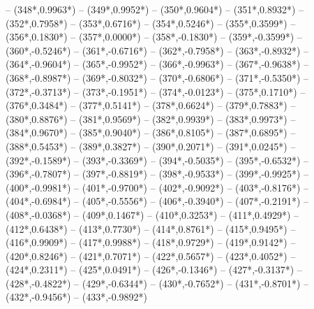 {		-- ({348*\dx},{0.9963*\dy})
		-- ({349*\dx},{0.9952*\dy})
		-- ({350*\dx},{0.9604*\dy})
		-- ({351*\dx},{0.8932*\dy})
		-- ({352*\dx},{0.7958*\dy})
		-- ({353*\dx},{0.6716*\dy})
		-- ({354*\dx},{0.5246*\dy})
		-- ({355*\dx},{0.3599*\dy})
		-- ({356*\dx},{0.1830*\dy})
		-- ({357*\dx},{0.0000*\dy})
		-- ({358*\dx},{-0.1830*\dy})
		-- ({359*\dx},{-0.3599*\dy})
		-- ({360*\dx},{-0.5246*\dy})
		-- ({361*\dx},{-0.6716*\dy})
		-- ({362*\dx},{-0.7958*\dy})
		-- ({363*\dx},{-0.8932*\dy})
		-- ({364*\dx},{-0.9604*\dy})
		-- ({365*\dx},{-0.9952*\dy})
		-- ({366*\dx},{-0.9963*\dy})
		-- ({367*\dx},{-0.9638*\dy})
		-- ({368*\dx},{-0.8987*\dy})
		-- ({369*\dx},{-0.8032*\dy})
		-- ({370*\dx},{-0.6806*\dy})
		-- ({371*\dx},{-0.5350*\dy})
		-- ({372*\dx},{-0.3713*\dy})
		-- ({373*\dx},{-0.1951*\dy})
		-- ({374*\dx},{-0.0123*\dy})
		-- ({375*\dx},{0.1710*\dy})
		-- ({376*\dx},{0.3484*\dy})
		-- ({377*\dx},{0.5141*\dy})
		-- ({378*\dx},{0.6624*\dy})
		-- ({379*\dx},{0.7883*\dy})
		-- ({380*\dx},{0.8876*\dy})
		-- ({381*\dx},{0.9569*\dy})
		-- ({382*\dx},{0.9939*\dy})
		-- ({383*\dx},{0.9973*\dy})
		-- ({384*\dx},{0.9670*\dy})
		-- ({385*\dx},{0.9040*\dy})
		-- ({386*\dx},{0.8105*\dy})
		-- ({387*\dx},{0.6895*\dy})
		-- ({388*\dx},{0.5453*\dy})
		-- ({389*\dx},{0.3827*\dy})
		-- ({390*\dx},{0.2071*\dy})
		-- ({391*\dx},{0.0245*\dy})
		-- ({392*\dx},{-0.1589*\dy})
		-- ({393*\dx},{-0.3369*\dy})
		-- ({394*\dx},{-0.5035*\dy})
		-- ({395*\dx},{-0.6532*\dy})
		-- ({396*\dx},{-0.7807*\dy})
		-- ({397*\dx},{-0.8819*\dy})
		-- ({398*\dx},{-0.9533*\dy})
		-- ({399*\dx},{-0.9925*\dy})
		-- ({400*\dx},{-0.9981*\dy})
		-- ({401*\dx},{-0.9700*\dy})
		-- ({402*\dx},{-0.9092*\dy})
		-- ({403*\dx},{-0.8176*\dy})
		-- ({404*\dx},{-0.6984*\dy})
		-- ({405*\dx},{-0.5556*\dy})
		-- ({406*\dx},{-0.3940*\dy})
		-- ({407*\dx},{-0.2191*\dy})
		-- ({408*\dx},{-0.0368*\dy})
		-- ({409*\dx},{0.1467*\dy})
		-- ({410*\dx},{0.3253*\dy})
		-- ({411*\dx},{0.4929*\dy})
		-- ({412*\dx},{0.6438*\dy})
		-- ({413*\dx},{0.7730*\dy})
		-- ({414*\dx},{0.8761*\dy})
		-- ({415*\dx},{0.9495*\dy})
		-- ({416*\dx},{0.9909*\dy})
		-- ({417*\dx},{0.9988*\dy})
		-- ({418*\dx},{0.9729*\dy})
		-- ({419*\dx},{0.9142*\dy})
		-- ({420*\dx},{0.8246*\dy})
		-- ({421*\dx},{0.7071*\dy})
		-- ({422*\dx},{0.5657*\dy})
		-- ({423*\dx},{0.4052*\dy})
		-- ({424*\dx},{0.2311*\dy})
		-- ({425*\dx},{0.0491*\dy})
		-- ({426*\dx},{-0.1346*\dy})
		-- ({427*\dx},{-0.3137*\dy})
		-- ({428*\dx},{-0.4822*\dy})
		-- ({429*\dx},{-0.6344*\dy})
		-- ({430*\dx},{-0.7652*\dy})
		-- ({431*\dx},{-0.8701*\dy})
		-- ({432*\dx},{-0.9456*\dy})
		-- ({433*\dx},{-0.9892*\dy})
}
